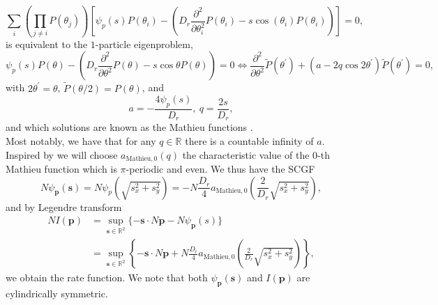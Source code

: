 \documentclass[pre,aps,superscriptaddress,nofootinbib]{revtex4}
\begin{document}
\begin{equation}
\sum_i \left(\prod_{j \neq i} P(\theta_j)\right) \left[\psi_{p}(s) P(\theta_i) - \left(D_r \frac{\partial^2}{\partial \theta_i^2} P(\theta_i) - s \cos(\theta_i) P(\theta_i)\right)\right] = 0,
\end{equation}
is equivalent to the $1$-particle eigenproblem,
\begin{equation}
\psi_{p}(s) P(\theta) - \left(D_r \frac{\partial^2}{\partial \theta^2} P(\theta) - s \cos\theta P(\theta)\right) = 0 \Leftrightarrow \frac{\partial^2}{\partial \theta^2} \tilde{P}(\theta^{\prime}) + (a - 2 q \cos 2 \theta^{\prime}) \tilde{P}(\theta^{\prime}) = 0,
\label{1P_eigenproblem}
\end{equation}
with $2 \theta^{\prime} = \theta$, $\tilde{P}(\theta/2) = P(\theta)$, and
\begin{equation}
a = - \frac{4 \psi_{p}(s)}{D_r},~ q = \frac{2 s}{D_r},
\end{equation}
and which solutions are known as the Mathieu functions \cite{mathieu}.\\

Most notably, we have that for any $q \in \mathbb{R}$ there is a countable infinity of $a$. Inspired by \cite{grandpre2018current} we will choose $a_{\mathrm{Mathieu}, 0}(q)$ the characteristic value of the $0$-th Mathieu function which is $\pi$-periodic and even. We thus have the SCGF
\begin{equation}
N \psi_{\bm{p}}(\bm{s}) = N \psi_{p}\left(\sqrt{s_x^2 + s_y^2}\right) = - N \frac{D_r}{4} a_{\mathrm{Mathieu}, 0}\left(\frac{2}{D_r} \sqrt{s_x^2 + s_y^2}\right),
\end{equation}
and by Legendre transform
\begin{equation}
\begin{aligned}
N I(\bm{p}) &= \sup_{\bm{s} \in \mathbb{R}^2} \{- \bm{s} \cdot N \bm{p} - N \psi_{\bm{p}}(s)\}\\
&= \sup_{\bm{s} \in \mathbb{R}^2} \left\{- \bm{s} \cdot N \bm{p} + N \frac{D_r}{4} a_{\mathrm{Mathieu}, 0}\left(\frac{2}{D_r} \sqrt{s_x^2 + s_y^2}\right)\right\},
\end{aligned}
\end{equation}
we obtain the rate function. We note that both $\psi_{\bm{p}}(\bm{s})$ and $I(\bm{p})$ are cylindrically symmetric.\\
\end{document}
